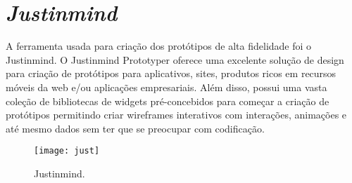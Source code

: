 	\section[Justinmind]{\emph{Justinmind}}
	\label{sec:ferramentas_bitStrips}

		A ferramenta usada para criação dos protótipos de alta fidelidade foi o Justinmind. O Justinmind Prototyper oferece uma excelente solução de design para criação de protótipos para aplicativos, sites, produtos ricos em recursos móveis da web e/ou aplicações empresariais. Além disso, possui uma vasta coleção de bibliotecas de widgets pré-concebidos para começar a criação de protótipos permitindo criar wireframes interativos com interações, animações e até mesmo dados sem ter que se preocupar com codificação. \cite{just}

		\begin{figure}[h]
			\centering
			\texttt{[image: just]}
			\caption[Justinmind]{Justinmind.}
			\label{fig:just}
		\end{figure}